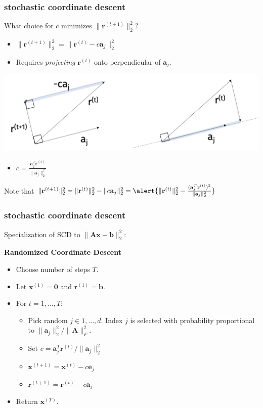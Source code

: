\documentclass[compress]{beamer}
\newcommand{\bv}[1]{\mathbf{#1}}
\begin{document}
\begin{frame}[t]
	\frametitle{stochastic coordinate descent}
	\begin{center}
		What choice for $c$ minimizes $\|\bv{r}^{(t+1)}\|_2^2$?
	\end{center}

\begin{itemize}
	\item $\|\bv{r}^{(t+1)}\|_2^2 = \|\bv{r}^{(t)} - c\bv{a}_j\|_2^2$
	\item Requires \emph{projecting} $\bv{r}^{(t)}$ onto perpendicular of $\bv{a}_j$.
\end{itemize}
\vspace{-1em}
\begin{center}
	\includegraphics*[width=.8\textwidth]{projection.png}
\end{center}
	\begin{itemize}
		\item $c = \frac{\bv{a}_j^T\bv{r}^{(t)}}{\|\bv{a}_j\|_2^2}$
	\end{itemize}

Note that $\|\bv{r}^{(t+1)}\|_2^2 = \|\bv{r}^{(t)}\|_2^2 - \|c\bv{a}_j\|_2^2 = \alert{\|\bv{r}^{(t)}\|_2^2 - \frac{(\bv{a}_j^T\bv{r}^{(t)})^2}{\|\bv{a}_j\|_2^2}}$
\end{frame}


\begin{frame}[t]
	\frametitle{stochastic coordinate descent}
	Specialization of SCD to $\|\bv{A}\bv{x} - \bv{b}\|_2^2$:
	\vspace{1em}
	
	\textbf{Randomized Coordinate Descent}
	\begin{itemize}
		\item Choose number of steps $T$. 
		\item Let $\bv{x}^{(1)} = \bv{0}$ and  $\bv{r}^{(1)} = \bv{b}$.
		\item For $t = 1,\ldots, T$:
		\begin{itemize}
			\item Pick random $j \in 1, \ldots, d$. Index $j$ is selected with probability proportional to $\|\bv{a}_j\|_2^2/\|\bv{A}\|_F^2$.
			\item Set $c = \bv{a}_j^T\bv{r}^{(t)}/\|\bv{a}_j\|_2^2$
			\item $\bv{x}^{(t+1)} = \bv{x}^{(t)} - c \bv{e}_j$
			\item $\bv{r}^{(t+1)} = \bv{r}^{(t)} - c \bv{a}_j$
		\end{itemize}
		\item Return ${\bv{x}^{(T)}}$.
	\end{itemize}
\end{frame}
\end{document}
